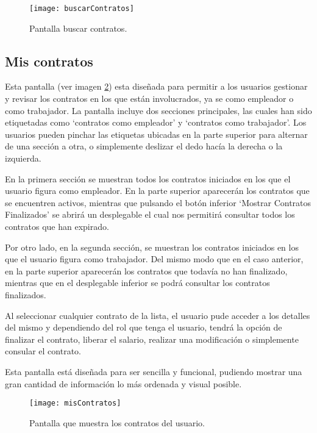 \begin{figure}[h]
	\label{img:buscarContratos}
	\centering
	\texttt{[image: buscarContratos]}
	\caption[Pantalla buscar contratos]{Pantalla buscar contratos.}
\end{figure}



\subsection{Mis contratos}

Esta pantalla (ver imagen \ref{img:misContratos}) esta diseñada para permitir a los usuarios gestionar y revisar los contratos en los que están involucrados, ya se como empleador o como trabajador.
La pantalla incluye dos secciones principales, las cuales han sido etiquetadas como `contratos como empleador' y `contratos como trabajador'. Los usuarios pueden pinchar las etiquetas ubicadas en la parte superior para alternar de una sección a otra, o simplemente deslizar el dedo hacía la derecha o la izquierda.

En la primera sección se muestran todos los contratos iniciados en los que el usuario figura como empleador. En la parte superior aparecerán los contratos que se encuentren activos, mientras que pulsando el botón inferior `Mostrar Contratos Finalizados' se abrirá un desplegable el cual nos permitirá consultar todos los contratos que han expirado.

Por otro lado, en la segunda sección, se muestran los contratos iniciados en los que el usuario figura como trabajador. Del mismo modo que en el caso anterior, en la parte superior aparecerán los contratos que todavía no han finalizado, mientras que en el desplegable inferior se podrá consultar los contratos finalizados.

Al seleccionar cualquier contrato de la lista, el usuario pude acceder a los detalles del mismo y dependiendo del rol que tenga el usuario, tendrá la opción de finalizar el contrato, liberar el salario, realizar una modificación o simplemente consular el contrato.

Esta pantalla está diseñada para ser sencilla y funcional, pudiendo mostrar una gran cantidad de información lo más ordenada y visual posible.

\begin{figure}[h]
	\label{img:misContratos}
	\centering
	\texttt{[image: misContratos]}
	\caption[Pantalla contratos del usuario]{Pantalla que muestra los contratos del usuario.}
\end{figure}


